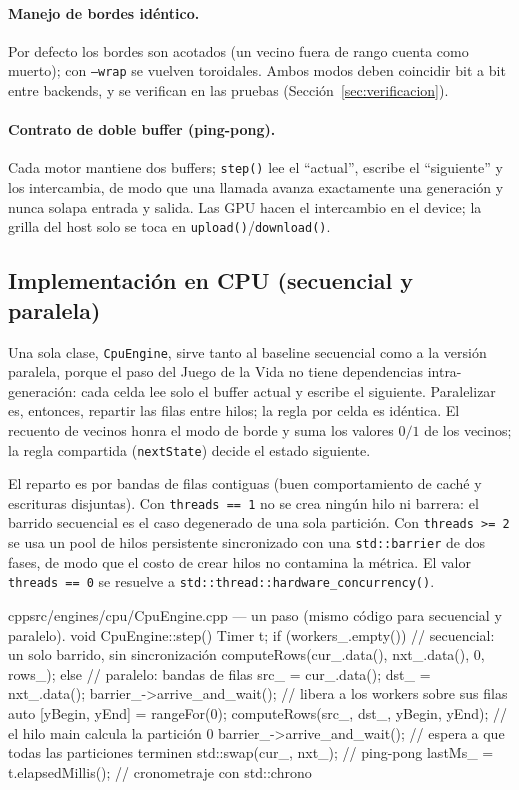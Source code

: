 \documentclass[
	spanish,
	letterpaper, oneside
]{article}
\begin{document}
\paragraph{Manejo de bordes idéntico.} Por defecto los bordes son acotados (un
vecino fuera de rango cuenta como muerto); con \texttt{--wrap} se vuelven
toroidales. Ambos modos deben coincidir bit a bit entre backends, y se verifican
en las pruebas (Sección~\ref{sec:verificacion}).

\paragraph{Contrato de doble buffer (ping-pong).} Cada motor mantiene dos
buffers; \texttt{step()} lee el ``actual'', escribe el ``siguiente'' y los
intercambia, de modo que una llamada avanza exactamente una generación y nunca
solapa entrada y salida. Las GPU hacen el intercambio en el device; la
grilla del host solo se toca en \texttt{upload()}/\texttt{download()}.

\subsection{Implementación en CPU (secuencial y paralela)}
\label{sec:impl-cpu}

Una sola clase, \texttt{CpuEngine}, sirve tanto al baseline secuencial como
a la versión paralela, porque el paso del Juego de la Vida no tiene dependencias
intra-generación: cada celda lee solo el buffer actual y escribe el siguiente.
Paralelizar es, entonces, repartir las filas entre hilos; la regla por
celda es idéntica. El recuento de vecinos honra el modo de borde y suma los
valores $0/1$ de los vecinos; la regla compartida (\texttt{nextState}) decide el
estado siguiente.

El reparto es por bandas de filas contiguas (buen comportamiento de caché y
escrituras disjuntas). Con \texttt{threads == 1} no se crea ningún hilo ni
barrera: el barrido secuencial es el caso degenerado de una sola partición. Con
\texttt{threads >= 2} se usa un pool de hilos persistente sincronizado con
una \texttt{std::barrier} de dos fases, de modo que el costo de crear hilos no
contamina la métrica. El valor \texttt{threads == 0} se resuelve a
\texttt{std::thread::hardware\_concurrency()}.

\begin{sourcecode}{cpp}{src/engines/cpu/CpuEngine.cpp --- un paso (mismo código para secuencial y paralelo).}
void CpuEngine::step() {
  Timer t;
  if (workers_.empty()) {                  // secuencial: un solo barrido, sin sincronización
    computeRows(cur_.data(), nxt_.data(), 0, rows_);
  } else {                                  // paralelo: bandas de filas
    src_ = cur_.data();
    dst_ = nxt_.data();
    barrier_->arrive_and_wait();            // libera a los workers sobre sus filas
    auto [yBegin, yEnd] = rangeFor(0);
    computeRows(src_, dst_, yBegin, yEnd);   // el hilo main calcula la partición 0
    barrier_->arrive_and_wait();            // espera a que todas las particiones terminen
  }
  std::swap(cur_, nxt_);                     // ping-pong
  lastMs_ = t.elapsedMillis();              // cronometraje con std::chrono
}
\end{sourcecode}
\end{document}
